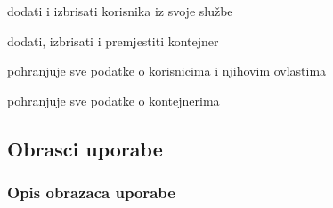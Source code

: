 \begin{packed_enum}
				\begin{packed_enum}
				
					\item dodati i izbrisati korisnika iz svoje službe
					\item dodati, izbrisati i premjestiti kontejner 				
				
				\end{packed_enum}
				
				\item	{}
				
				\begin{packed_enum}
				
					\item pohranjuje sve podatke o korisnicima i njihovim ovlastima
					\item pohranjuje sve podatke o kontejnerima 
				
				\end{packed_enum}
				
			\end{packed_enum}
			
			\eject 
			
			
				
			\subsection{Obrasci uporabe}
			
			
			\subsubsection{Opis obrazaca uporabe}
			

